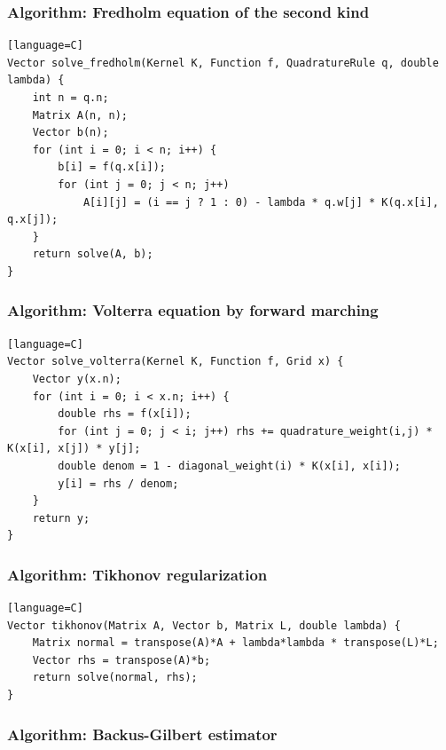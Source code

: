 \documentclass[11pt]{article}
\begin{document}
\subsubsection{Algorithm: Fredholm equation of the second kind}\label{algorithm-fredholm-equation-of-the-second-kind}

\begin{verbatim}[language=C]
Vector solve_fredholm(Kernel K, Function f, QuadratureRule q, double lambda) {
    int n = q.n;
    Matrix A(n, n);
    Vector b(n);
    for (int i = 0; i < n; i++) {
        b[i] = f(q.x[i]);
        for (int j = 0; j < n; j++)
            A[i][j] = (i == j ? 1 : 0) - lambda * q.w[j] * K(q.x[i], q.x[j]);
    }
    return solve(A, b);
}
\end{verbatim}

\subsubsection{Algorithm: Volterra equation by forward marching}\label{algorithm-volterra-equation-by-forward-marching}

\begin{verbatim}[language=C]
Vector solve_volterra(Kernel K, Function f, Grid x) {
    Vector y(x.n);
    for (int i = 0; i < x.n; i++) {
        double rhs = f(x[i]);
        for (int j = 0; j < i; j++) rhs += quadrature_weight(i,j) * K(x[i], x[j]) * y[j];
        double denom = 1 - diagonal_weight(i) * K(x[i], x[i]);
        y[i] = rhs / denom;
    }
    return y;
}
\end{verbatim}

\subsubsection{Algorithm: Tikhonov regularization}\label{algorithm-tikhonov-regularization}

\begin{verbatim}[language=C]
Vector tikhonov(Matrix A, Vector b, Matrix L, double lambda) {
    Matrix normal = transpose(A)*A + lambda*lambda * transpose(L)*L;
    Vector rhs = transpose(A)*b;
    return solve(normal, rhs);
}
\end{verbatim}

\subsubsection{Algorithm: Backus-Gilbert estimator}\label{algorithm-backus-gilbert-estimator}
\end{document}
